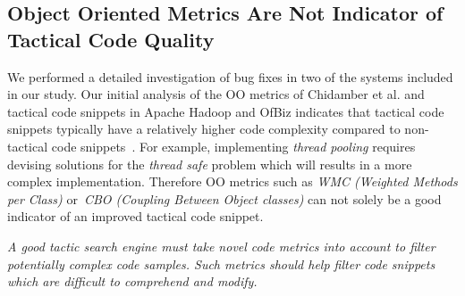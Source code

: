 \subsection{Object Oriented Metrics Are Not Indicator of Tactical Code Quality}
We performed a detailed investigation of bug fixes in two of the systems included in our study. Our initial analysis of the OO metrics of Chidamber et al.\cite{491650} and tactical code snippets in Apache Hadoop and OfBiz indicates that tactical code snippets typically have a relatively higher code complexity compared to non-tactical code snippets~\cite{MSRBuble}. For example, implementing \textit{thread pooling} requires devising solutions for the \textit{thread safe} problem which will results in a more complex implementation. Therefore OO metrics such as \emph{WMC (Weighted Methods per Class)} or~\emph{CBO (Coupling Between Object classes)} can not solely be a good indicator of an improved tactical code snippet.

\textit{A good tactic search engine must take novel code metrics into account to filter potentially complex code samples. Such metrics should help filter code snippets which are difficult to comprehend and modify.}